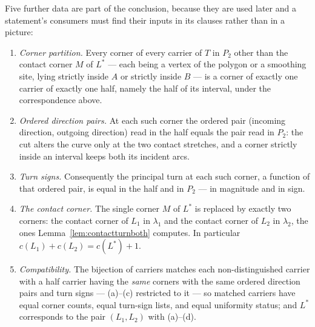 \begin{lemma}
Five further data are part of the conclusion, because they are used later
and a statement's consumers must find their inputs in its clauses
rather than in a picture:
\begin{enumerate}
\item[(a)] \emph{Corner partition.} Every corner of every carrier of $T$ in
$P_2$ other than the contact corner $M$ of $L^{*}$ --- each being a vertex of
the polygon or a smoothing site, lying strictly inside $A$ or strictly inside
$B$ --- is a corner of exactly one carrier of exactly one half, namely the
half of its interval, under the correspondence above.
\item[(b)] \emph{Ordered direction pairs.} At each such corner the ordered
pair (incoming direction, outgoing direction) read in the half equals the pair
read in $P_2$: the cut alters the curve only at the two contact stretches, and
a corner strictly inside an interval keeps both its incident arcs.
\item[(c)] \emph{Turn signs.} Consequently the principal turn at each such
corner, a function of that ordered pair, is equal in the half and in $P_2$ ---
in magnitude and in sign.
\item[(d)] \emph{The contact corner.} The single corner $M$ of $L^{*}$ is
replaced by exactly two corners: the contact corner of $L_1$ in $\lambda_1$
and the contact corner of $L_2$ in $\lambda_2$, the ones
Lemma~\ref{lem:contactturnboth} computes. In particular
$c(L_1)+c(L_2)=c(L^{*})+1$.
\item[(e)] \emph{Compatibility.} The bijection of carriers matches each
non-distinguished carrier with a half carrier having the \emph{same} corners
with the same ordered direction pairs and turn signs --- (a)--(c) restricted to
it --- so matched carriers have equal corner counts, equal turn-sign lists, and
equal uniformity status; and $L^{*}$ corresponds to the pair $(L_1,L_2)$ with
(a)--(d).
\end{enumerate}
\end{lemma}
